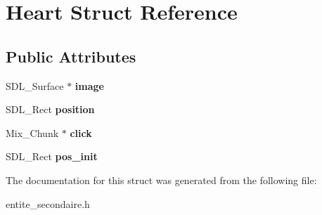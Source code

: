 \hypertarget{structHeart}{}\section{Heart Struct Reference}
\label{structHeart}
\subsection*{Public Attributes}
\begin{DoxyCompactItemize}
\item 
\mbox{\label{structHeart_a9a0f6ed60e258415e83bdb5a3118e151}} 
S\+D\+L\+\_\+\+Surface $\ast$ {\bfseries image}
\item 
\mbox{\label{structHeart_ac4d13d2d7a77af3cd8822b18d35168a2}} 
S\+D\+L\+\_\+\+Rect {\bfseries position}
\item 
\mbox{\label{structHeart_a9a9aa1322dd7d19c8fae369723ebd865}} 
Mix\+\_\+\+Chunk $\ast$ {\bfseries click}
\item 
\mbox{\label{structHeart_a58e54316de92b359afa6c753b689fbdc}} 
S\+D\+L\+\_\+\+Rect {\bfseries pos\+\_\+init}
\end{DoxyCompactItemize}


The documentation for this struct was generated from the following file\+:\begin{DoxyCompactItemize}
\item 
entite\+\_\+secondaire.\+h\end{DoxyCompactItemize}
